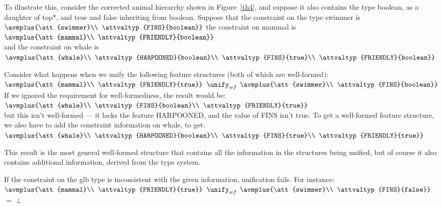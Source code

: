 \documentclass[12pt]{report}
\begin{document}
To illustrate this,
consider the corrected
animal hierarchy shown in Figure~\ref{th4},
and suppose it also contains the type {\type boolean},
as a daughter of {\type *top*}, and {\type true} and {\type false}
inheriting from {\type boolean}.
Suppose that the constraint on the type {\type swimmer} is\\
{\tiny
$\avmplus{\att{swimmer}\\
\attvaltyp{FINS}{boolean}}$}
the constraint on
{\type mammal} is\\
{\tiny $\avmplus{\att{mammal}\\
\attvaltyp{FRIENDLY}{boolean}}$}\\
and the constraint on {\type whale} is\\
{\tiny $\avmplus{\att{whale}\\
\attvaltyp{HARPOONED}{boolean}\\
\attvaltyp{FINS}{true}\\
\attvaltyp{FRIENDLY}{boolean}}$}

Consider what happens when we unify the following
feature structures (both of which are well-formed):\\
{\tiny $\avmplus{\att{mammal}\\
\attvaltyp{FRIENDLY}{true}}$} $\unify_{wf}$
{\tiny
$\avmplus{\att{swimmer}\\
\attvaltyp{FINS}{boolean}}$}\\
If we ignored the requirement for
well-formedness, the result would be:\\
{\tiny $\avmplus{\att{whale}\\
\attvaltyp{FINS}{boolean}\\
\attvaltyp{FRIENDLY}{true}}$}\\
but this isn't well-formed --- it lacks the feature 
HARPOONED, and the value of FINS isn't {\type true}.
To get a well-formed feature
structure, we also have to add the constraint information
on {\type whale}, to get:\\
{\tiny $\avmplus{\att{whale}\\
\attvaltyp{HARPOONED}{boolean}\\
\attvaltyp{FINS}{true}\\
\attvaltyp{FRIENDLY}{true}}$}

This result is the most general well-formed structure that
contains all the information in the structures being unified,
but of course it also contains additional information, derived from
the type system.

If the constraint on the glb type is inconsistent with
the given information, unification fails.
For instance:\\
{\tiny $\avmplus{\att{mammal}\\
\attvaltyp{FRIENDLY}{true}}$} $\unify_{wf}$
{\tiny
$\avmplus{\att{swimmer}\\
\attvaltyp{FINS}{false}}$} $=$ $\bot$\\
\end{document}
